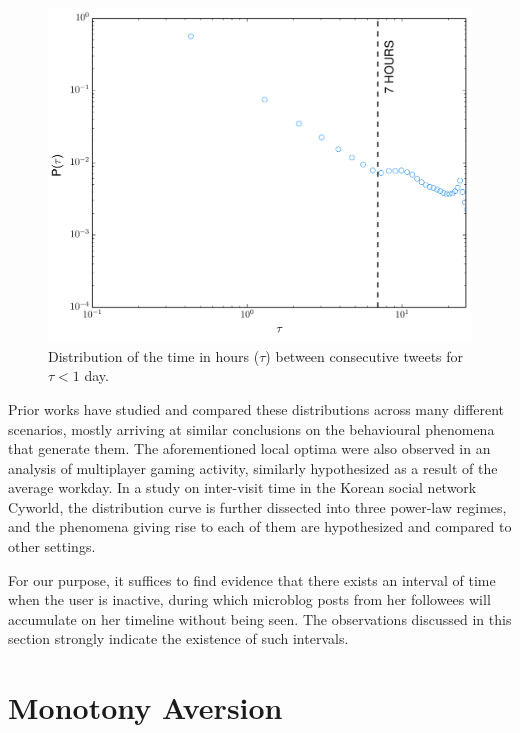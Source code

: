 \documentclass[onesided,letterpaper]{tufte-book}
\begin{document}
\begin{figure}
    \includegraphics[width=\linewidth]{weibo_iet_zoomed}
    \caption[Weibo intertweet time distribution for $\tau < 1$ day.]{Distribution of the time in hours ($\tau$) between consecutive tweets for $\tau < 1$ day.}
    \label{fig:weibo-iet-zoomed}
\end{figure}

Prior works have studied and compared these distributions across many different scenarios, mostly arriving at similar conclusions on the behavioural phenomena that generate them. The aforementioned local optima were also observed in an analysis of multiplayer gaming activity\cite{mryglod2015interevent}, similarly hypothesized as a result of the average workday. In a study on inter-visit time in the Korean social network Cyworld\cite{chun2008comparison}, the distribution curve is further dissected into three power-law regimes, and the phenomena giving rise to each of them are hypothesized and compared to other settings.

For our purpose, it suffices to find evidence that there exists an interval of time when the user is inactive, during which microblog posts from her followees will accumulate on her timeline without being seen. The observations discussed in this section strongly indicate the existence of such intervals.

\newpage

\section{Monotony Aversion}
\end{document}
